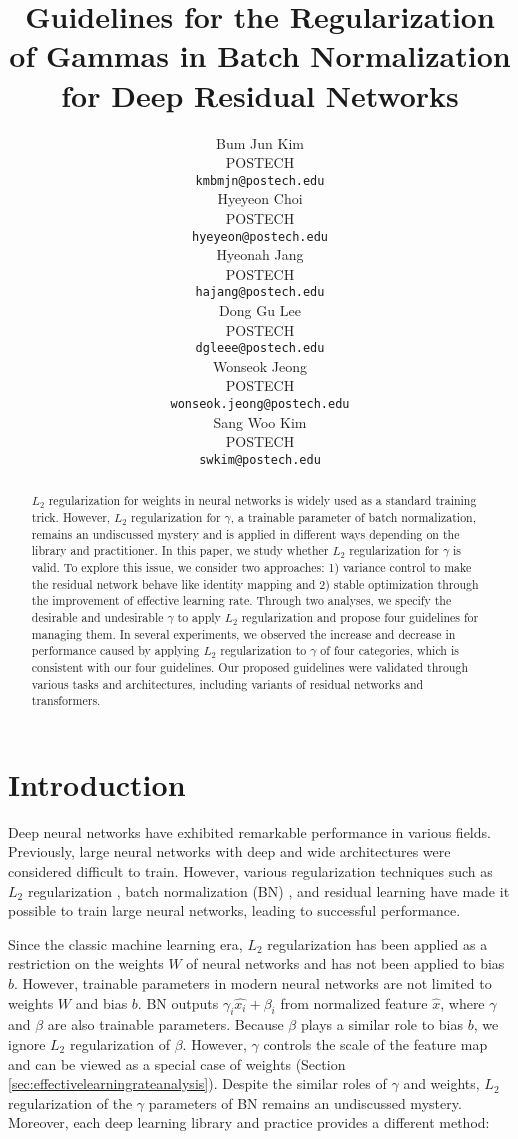 \documentclass{article}
\title{Guidelines for the Regularization of Gammas in Batch Normalization for Deep Residual Networks}
\author{Bum Jun Kim \\
    POSTECH \\
\texttt{kmbmjn@postech.edu} \\
    \And
    Hyeyeon Choi \\
    POSTECH \\
\texttt{hyeyeon@postech.edu} \\
    \AND
    Hyeonah Jang \\
    POSTECH \\
\texttt{hajang@postech.edu} \\
    \And
    Dong Gu Lee \\
    POSTECH \\
\texttt{dgleee@postech.edu} \\
    \And
    Wonseok Jeong \\
    POSTECH \\
\texttt{wonseok.jeong@postech.edu} \\
    \And
    Sang Woo Kim \\
    POSTECH \\
\texttt{swkim@postech.edu} \\
}
\begin{document}
\maketitle


\begin{abstract}
	$L_2$ regularization for weights in neural networks is widely used as a standard training trick. However, $L_2$ regularization for $\gamma$, a trainable parameter of batch normalization, remains an undiscussed mystery and is applied in different ways depending on the library and practitioner. In this paper, we study whether $L_2$ regularization for $\gamma$ is valid. To explore this issue, we consider two approaches: 1) variance control to make the residual network behave like identity mapping and 2) stable optimization through the improvement of effective learning rate. Through two analyses, we specify the desirable and undesirable $\gamma$ to apply $L_2$ regularization and propose four guidelines for managing them. In several experiments, we observed the increase and decrease in performance caused by applying $L_2$ regularization to $\gamma$ of four categories, which is consistent with our four guidelines. Our proposed guidelines were validated through various tasks and architectures, including variants of residual networks and transformers.
\end{abstract}

\section{Introduction}
\label{sec:introduction}
Deep neural networks have exhibited remarkable performance in various fields. Previously, large neural networks with deep and wide architectures were considered difficult to train. However, various regularization techniques such as $L_2$ regularization \cite{giclr/ZhangWXG19}, batch normalization (BN) \cite{gicml/IoffeS15}, and residual learning \cite{gcvpr/HeZRS16} have made it possible to train large neural networks, leading to successful performance.

Since the classic machine learning era, $L_2$ regularization has been applied as a restriction on the weights $W$ of neural networks and has not been applied to bias $b$. However, trainable parameters in modern neural networks are not limited to weights $W$ and bias $b$. BN outputs $\gamma_i \hat{x_i} + \beta_i$ from normalized feature $\hat{x}$, where $\gamma$ and $\beta$ are also trainable parameters. Because $\beta$ plays a similar role to bias $b$, we ignore $L_2$ regularization of $\beta$. However, $\gamma$ controls the scale of the feature map and can be viewed as a special case of weights (Section \ref{sec:effectivelearningrateanalysis}).
Despite the similar roles of $\gamma$ and weights, $L_2$ regularization of the $\gamma$ parameters of BN remains an undiscussed mystery. Moreover, each deep learning library and practice provides a different method:
\end{document}
